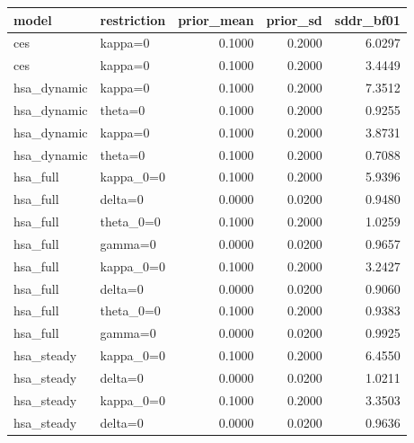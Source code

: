 \begin{tabular}{llrrr}
\toprule
model & restriction & prior\_mean & prior\_sd & sddr\_bf01 \\
\midrule
ces & kappa=0 & 0.1000 & 0.2000 & 6.0297 \\
ces & kappa=0 & 0.1000 & 0.2000 & 3.4449 \\
hsa\_dynamic & kappa=0 & 0.1000 & 0.2000 & 7.3512 \\
hsa\_dynamic & theta=0 & 0.1000 & 0.2000 & 0.9255 \\
hsa\_dynamic & kappa=0 & 0.1000 & 0.2000 & 3.8731 \\
hsa\_dynamic & theta=0 & 0.1000 & 0.2000 & 0.7088 \\
hsa\_full & kappa\_0=0 & 0.1000 & 0.2000 & 5.9396 \\
hsa\_full & delta=0 & 0.0000 & 0.0200 & 0.9480 \\
hsa\_full & theta\_0=0 & 0.1000 & 0.2000 & 1.0259 \\
hsa\_full & gamma=0 & 0.0000 & 0.0200 & 0.9657 \\
hsa\_full & kappa\_0=0 & 0.1000 & 0.2000 & 3.2427 \\
hsa\_full & delta=0 & 0.0000 & 0.0200 & 0.9060 \\
hsa\_full & theta\_0=0 & 0.1000 & 0.2000 & 0.9383 \\
hsa\_full & gamma=0 & 0.0000 & 0.0200 & 0.9925 \\
hsa\_steady & kappa\_0=0 & 0.1000 & 0.2000 & 6.4550 \\
hsa\_steady & delta=0 & 0.0000 & 0.0200 & 1.0211 \\
hsa\_steady & kappa\_0=0 & 0.1000 & 0.2000 & 3.3503 \\
hsa\_steady & delta=0 & 0.0000 & 0.0200 & 0.9636 \\
\bottomrule
\end{tabular}
